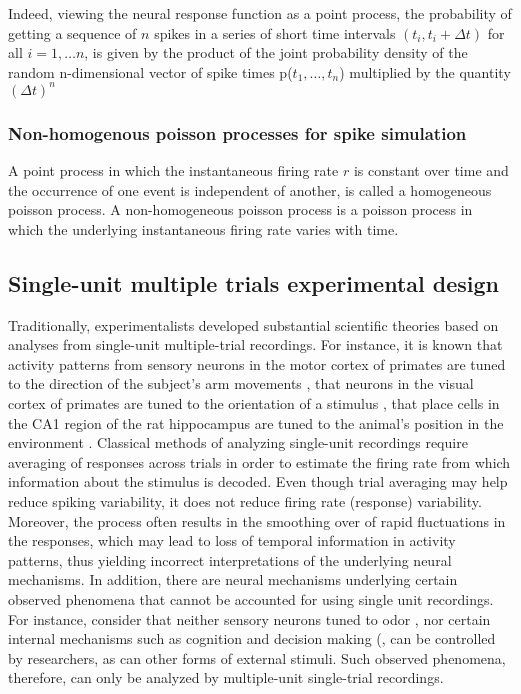 Indeed, viewing the neural response function as a point process, the
probability of getting a sequence of $n$ spikes in a series of short time intervals $(t_{i}, t_{i}+\Delta t)$ for all $i=1, \ldots n$, is given by the
product of the joint probability density of the random n-dimensional
vector of spike times p($t_{1}, \ldots, t_{n}$) multiplied by the quantity
$(\Delta t)^{n}$\\


\subsubsection{Non-homogenous poisson processes for spike simulation}
A point process in which the instantaneous firing rate $r$ is constant over time
and the occurrence of one event is independent of another, is called a homogeneous poisson process.
A non-homogeneous poisson process is a poisson process in which the underlying 
instantaneous firing rate varies with time. 


\subsection{Single-unit multiple trials experimental design}

Traditionally, experimentalists developed substantial scientific theories based on analyses from single-unit multiple-trial recordings. For instance, it is known that activity patterns from sensory neurons in the motor cortex of primates are tuned to the direction of the subject's arm movements \cite{Georgopoulos1982}, that neurons in the visual cortex of primates are tuned to the orientation of a stimulus \cite{Hubel1968}, that place cells in the CA1 region of the rat hippocampus are tuned to the animal's position in the environment \cite{OKeefe1971}. Classical  methods of analyzing single-unit recordings require averaging of responses across trials in order to estimate the firing rate from which information about the stimulus is decoded. Even though trial averaging may help reduce spiking variability, it does not reduce firing rate (response) variability.
Moreover, the process often results in the smoothing over of rapid fluctuations in the 
responses, which may lead to loss of temporal information in activity patterns, thus yielding incorrect interpretations of the underlying neural mechanisms.
In addition, there are neural mechanisms underlying certain observed phenomena 
that cannot be accounted for using single unit recordings.
For instance, consider that neither sensory neurons tuned to odor \cite{Hopfield1995},
nor certain internal mechanisms such as cognition and decision making (\cite{Redish2016,
Vos2015, Kaufman2014, Mazor2005}, can be controlled by researchers, as can other forms of external stimuli. Such observed phenomena, therefore, can only be analyzed by multiple-unit single-trial recordings. 




